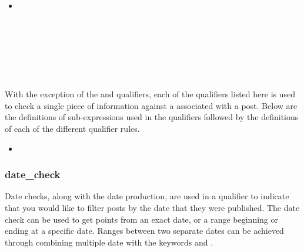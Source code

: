 \begin{itemize}[leftmargin=2in]
    \item[\nonterminal{qualifier}] \bnf{:} \\
    \bnf{|} \\
    \bnf{|} \\
    \bnf{|} \\
    \bnf{|} \\
    \bnf{|} \\
    \bnf{|} \\
\end{itemize}

With the exception of the  and  qualifiers, each of the qualifiers listed here is used to check a single piece of
information against a  associated with a post. Below are the definitions of sub-expressions used in the qualifiers followed
by the definitions of each of the different  qualifier rules.

\begin{itemize}[leftmargin=2in]
    \item[\nonterminal{with\_exp}] \bnf{:}  \bnf{|} 
\end{itemize}

\subsubsection{date\_check}
Date checks, along with the date production, are used in a qualifier to indicate that you would like to filter posts by the date that
they were published. The date check can be used to get points from an exact date, or a range beginning or ending at a specific date.
Ranges between two separate dates can be achieved through combining multiple date  with the keywords  and .

